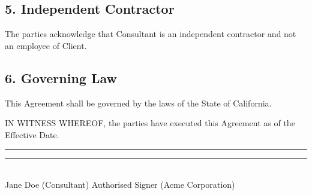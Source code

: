 \documentclass{article}
\begin{document}
\subsection*{5. Independent Contractor}
The parties acknowledge that Consultant is an independent contractor and not an employee of Client.

\subsection*{6. Governing Law}
This Agreement shall be governed by the laws of the State of California.

\vspace{0.5cm}

\noindent
IN WITNESS WHEREOF, the parties have executed this Agreement as of the Effective Date.

\vspace{0.8cm}

\noindent
\rule{5cm}{0.4pt} \hfill \rule{5cm}{0.4pt} \\
Jane Doe (Consultant) \hfill Authorised Signer (Acme Corporation)
\end{document}
